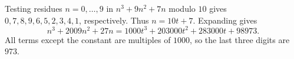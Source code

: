 Testing residues $n=0,\ldots,9$ in $n^3+9n^2+7n$ modulo $10$ gives $0,7,8,9,6,5,2,3,4,1$, respectively. Thus $n=10t+7$. Expanding gives\[n^3+2009n^2+27n=1000t^3+203000t^2+283000t+98973.\]All terms except the constant are multiples of $1000$, so the last three digits are $\boxed{973}$.
